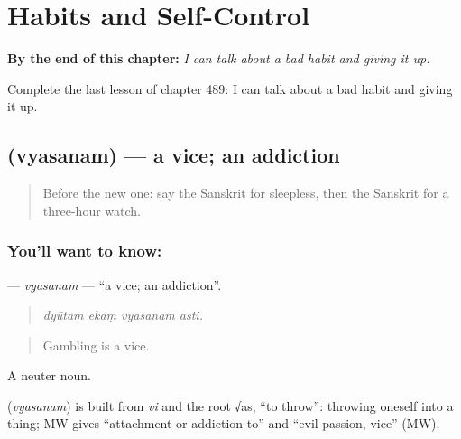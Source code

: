 
\chapter{Habits and Self-Control}
\label{ch:sa-habits-and-self-control}

\begin{chapteropening}
\textbf{By the end of this chapter:} \emph{I can talk about a bad habit and giving it up.}

Complete the last lesson of chapter 489: I can talk about a bad habit and giving it up.
\end{chapteropening}

\section[\texorpdfstring{\sk{व्यसनम्} (vyasanam)}{व्यसनम् (vyasanam)}]{ (vyasanam) — a vice; an addiction}

\label{lesson:SA-C489-vyasanam}



\begin{quote}
Before the new one: say the Sanskrit for sleepless, then the Sanskrit for a three-hour watch.
\end{quote}

\subsection*{You'll want to know: }
\textbf{} — \emph{vyasanam} — \textquotedblleft{}a vice; an addiction\textquotedblright{}.

\begin{quote}
   
\end{quote}

\begin{quote}
\emph{dyūtam ekaṃ vyasanam asti.}
\end{quote}

\begin{quote}
Gambling is a vice.
\end{quote}

A neuter noun.

\begin{cousinweb}
\textbf{} (\emph{vyasanam}) is built from \emph{vi} and the root √as, \textquotedblleft{}to throw\textquotedblright{}: throwing oneself into a thing; MW gives \textquotedblleft{}attachment or addiction to\textquotedblright{} and \textquotedblleft{}evil passion, vice\textquotedblright{} (MW).
\end{cousinweb}


